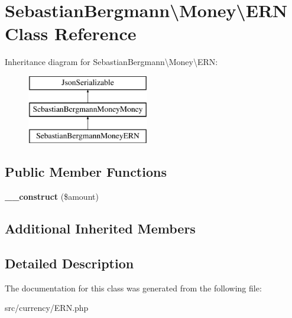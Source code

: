 \hypertarget{classSebastianBergmann_1_1Money_1_1ERN}{}\section{Sebastian\+Bergmann\textbackslash{}Money\textbackslash{}E\+R\+N Class Reference}
\label{classSebastianBergmann_1_1Money_1_1ERN}
Inheritance diagram for Sebastian\+Bergmann\textbackslash{}Money\textbackslash{}E\+R\+N\+:\begin{figure}[H]
\begin{center}
\leavevmode
\includegraphics[height=3.000000cm]{classSebastianBergmann_1_1Money_1_1ERN}
\end{center}
\end{figure}
\subsection*{Public Member Functions}
\begin{DoxyCompactItemize}
\item 
\hypertarget{classSebastianBergmann_1_1Money_1_1ERN_a1b6cde8a2b1f50cf772aaef96836c38c}{}{\bfseries \+\_\+\+\_\+construct} (\$amount)\label{classSebastianBergmann_1_1Money_1_1ERN_a1b6cde8a2b1f50cf772aaef96836c38c}

\end{DoxyCompactItemize}
\subsection*{Additional Inherited Members}


\subsection{Detailed Description}


The documentation for this class was generated from the following file\+:\begin{DoxyCompactItemize}
\item 
src/currency/E\+R\+N.\+php\end{DoxyCompactItemize}
